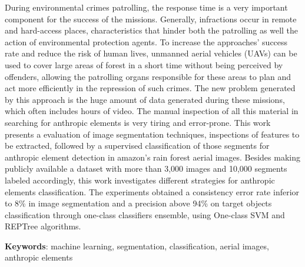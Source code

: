 \begin{resumo}[Abstract]
    During environmental crimes patrolling, the response time is a very important component for the success of the missions. Generally, infractions occur in remote and hard-access places, characteristics that hinder both the patrolling as well the action of environmental protection agents. To increase the approaches' success rate and reduce the risk of human lives, unmanned aerial vehicles (UAVs) can be used to cover large areas of forest in a short time without being perceived by offenders, allowing the patrolling organs responsible for these areas to plan and act more efficiently in the repression of such crimes. The new problem generated by this approach is the huge amount of data generated during these missions, which often includes hours of video. The manual inspection of all this material in searching for anthropic elements is very tiring and error-prone. This work presents a evaluation of image segmentation techniques, inspections of features to be extracted, followed by a supervised classification of those segments for anthropic element detection in amazon's rain forest aerial images. Besides making publicly available a dataset with more than 3,000 images and 10,000 segments labeled accordingly, this work investigates different strategies for anthropic elements classification. The experiments obtained a consistency error rate inferior to 8\% in image segmentation and a precision above 94\% on target objects classification through one-class classifiers ensemble, using One-class SVM and REPTree algorithms.

    \vspace{\onelineskip}
    \noindent
    \textbf{Keywords}: machine learning, segmentation, classification, aerial images, anthropic elements
\end{resumo}

